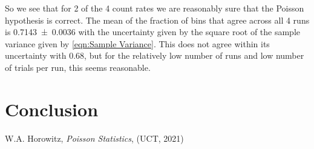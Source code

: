 \documentclass[12pt]{article}
\numberwithin{equation}{section}
\numberwithin{figure}{section}
\numberwithin{table}{section}
\begin{document}
\par So we see that for 2 of the 4 count rates we are reasonably sure that the Poisson hypothesis is correct. The mean of the fraction of bins that agree across all 4 runs is \num{0.7143(36)} with the uncertainty given by the square root of the sample variance given by \autoref{eqn:Sample Variance}. This does not agree within its uncertainty with 0.68, but for the relatively low number of runs and low number of trials per run, this seems reasonable. 

\section{Conclusion}\label{sec:Conclusion}






\newpage
\begin{thebibliography}{9}
    W.A. Horowitz, \textit{Poisson Statistics}, (UCT, 2021)

\end{thebibliography}
\end{document}
